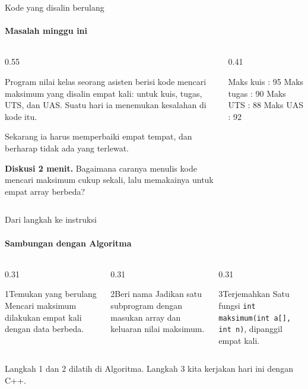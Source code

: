 \documentclass[t]{beamer}
\begin{document}

\begin{frame}[fragile]{Kode yang disalin berulang}
\framesubtitle{Masalah minggu ini}
\begin{columns}[T]
\begin{column}{0.55\textwidth}
{Program nilai kelas seorang asisten berisi kode mencari maksimum yang disalin empat kali: untuk kuis, tugas, UTS, dan UAS. Suatu hari ia menemukan kesalahan di kode itu.

\vspace{6pt}
Sekarang ia harus memperbaiki empat tempat, dan berharap tidak ada yang terlewat.\par}
\vspace{6pt}
\begin{Catatan}
\textbf{Diskusi 2 menit.} Bagaimana caranya menulis kode mencari maksimum cukup sekali, lalu memakainya untuk empat array berbeda?
\end{Catatan}
\end{column}
\begin{column}{0.41\textwidth}
\begin{Keluaran}[]
Maks kuis  : 95
Maks tugas : 90
Maks UTS   : 88
Maks UAS   : 92
\end{Keluaran}
\end{column}
\end{columns}
\end{frame}

\begin{frame}{Dari langkah ke instruksi}
\framesubtitle{Sambungan dengan Algoritma}
\begin{columns}[T]
\begin{column}{0.31\textwidth}
\begin{Langkah}{1}{Temukan yang berulang}
Mencari maksimum dilakukan empat kali dengan data berbeda.
\end{Langkah}
\end{column}
\begin{column}{0.31\textwidth}
\begin{Langkah}{2}{Beri nama}
Jadikan satu subprogram dengan masukan array dan keluaran nilai maksimum.
\end{Langkah}
\end{column}
\begin{column}{0.31\textwidth}
\begin{Langkah}{3}{Terjemahkan}
Satu fungsi \texttt{int maksimum(int a[], int n)}, dipanggil empat kali.
\end{Langkah}
\end{column}
\end{columns}
\vspace{10pt}
Langkah 1 dan 2 dilatih di Algoritma. Langkah 3 kita kerjakan hari ini dengan C++.
\end{frame}
\end{document}
